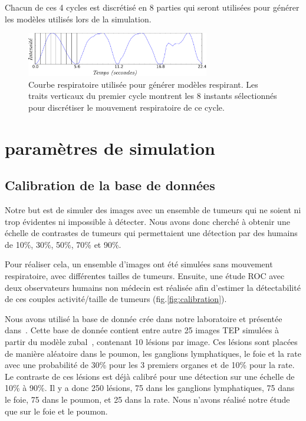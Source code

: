 Chacun de ces 4 cycles est discrétisé en 8 parties qui seront utilisées pour générer les modèles utilisés lors de la simulation. 


\begin{figure}
 \centering
 \includegraphics[width=8cm]{images/courbesRespi}

 \caption[signal respiratoire utilisé pour les modèles de la base de donnée]{Courbe respiratoire utilisée pour générer modèles respirant. Les traits verticaux du premier cycle montrent les 8 instants sélectionnés pour discrétiser le mouvement respiratoire de ce cycle.}
 \label{fig:cycleRespi}
\end{figure}

	\section{paramètres de simulation}

\subsection{Calibration de la base de données}

Notre but est de simuler des images avec un ensemble de tumeurs qui ne soient ni trop évidentes ni impossible à détecter. Nous avons donc cherché à obtenir une échelle de contrastes de tumeurs qui permettaient une détection par des humains de 10\%, 30\%, 50\%, 70\% et 90\%.

Pour réaliser cela, un ensemble d'images ont été simulées sans mouvement respiratoire, avec différentes tailles de tumeurs. Ensuite, une étude ROC avec deux observateurs humains non médecin est réalisée afin d'estimer la détectabilité de ces couples activité/taille de tumeurs (fig.\ref{fig:calibration}). 

Nous avons utilisé la base de donnée crée dans notre laboratoire et présentée dans~\cite{tomei2010oncopet_db}. Cette base de donnée contient entre autre 25 images TEP simulées à partir du modèle zubal~\cite{zubal1994computerized}, contenant 10 lésions par image. Ces lésions sont placées de manière aléatoire dans le poumon, les ganglions lymphatiques, le foie et la rate avec une probabilité de 30\% pour les 3 premiers organes et de 10\% pour la rate. Le contraste de ces lésions est déjà calibré pour une détection sur une échelle de 10\% à 90\%. Il y a donc 250 lésions, 75 dans les ganglions lymphatiques, 75 dans le foie, 75 dans le poumon, et 25 dans la rate. Nous n'avons réalisé notre étude que sur le foie et le poumon.

